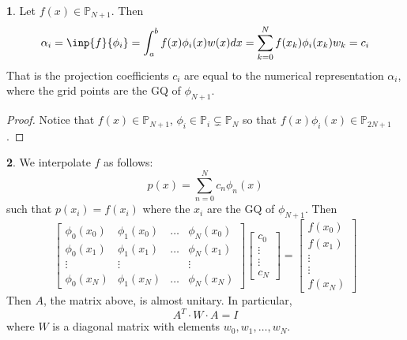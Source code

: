 \documentclass[12pt]{article}
\theoremstyle{definition}
\newtheorem{theorem}{\color{ForestGreen}{\textbf{Theorem}}}
\theoremstyle{definition}
\begin{document}
\begin{theorem}
	Let $f(x) \in \mathbb{P}_{N+1}$. Then 
	\begin{equation}
		\alpha_i = \inp{f}{\phi_i} = \int_a^b f(x)\phi_i(x)w(x)dx = \sum_{k=0}^N f(x_k)\phi_i(x_k)w_k = c_i
	\end{equation}
	That is the projection coefficients $c_i$ are equal to the numerical representation $\alpha_i$, where the grid points are the GQ of $\phi_{N+1}$.
\end{theorem}
\begin{proof}
	Notice that $f(x) \in \mathbb{P}_{N+1}$, $\phi_i \in \mathbb{P}_{i} \subsetneq \mathbb{P}_N$ so that $ f(x)\phi_i(x) \in \mathbb{P}_{2N+1}$.
\end{proof}

\begin{theorem}
We interpolate $f$ as follows:
\begin{equation}
	p(x) = \sum_{n=0}^N c_n \phi_n(x)
\end{equation}
such that $p(x_i) = f(x_i)$ where the $x_i$ are the GQ of $\phi_{N+1}$. Then
\begin{equation}
	\begin{bmatrix}
	\phi_0(x_0) & \phi_1(x_0) & \hdots & \phi_N(x_0) \\
	\phi_0(x_1) & \phi_1(x_1) & \hdots & \phi_N(x_1) \\
	\vdots & \vdots & & \vdots  \\
	\phi_0(x_N) & \phi_1(x_N) & \hdots & \phi_N(x_N)
	\end{bmatrix}
	\begin{bmatrix}
	c_0 \\ \vdots \\ \vdots \\ c_N
	\end{bmatrix}
	=
	\begin{bmatrix}
	f(x_0) \\ f(x_1) \\ \vdots \\ \vdots  \\ f(x_N)
	\end{bmatrix}
\end{equation}
Then $A$, the matrix above, is almost unitary. In particular,
\begin{equation}
	A^T \cdot W \cdot A = I
\end{equation}
where $W$ is a diagonal matrix with elements $w_0, w_1, \ldots, w_N$.
\end{theorem}
\end{document}
